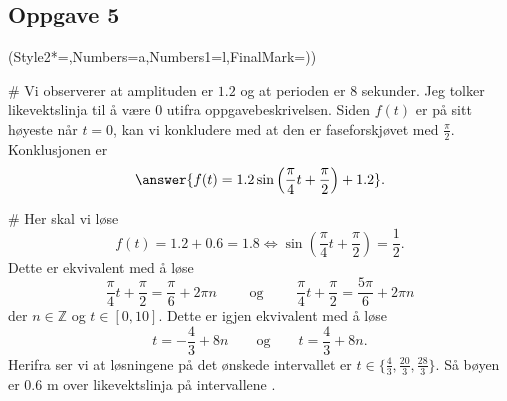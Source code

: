 \subsection*{Oppgave 5}
\begin{easylist}[enumerate]
	\ListProperties(Style2*=,Numbers=a,Numbers1=l,FinalMark={)})
	
	# Vi observerer at amplituden er $1.2$ og at perioden er $8$ sekunder. 
	Jeg tolker likevektslinja til å være $0$ utifra oppgavebeskrivelsen. 
	Siden $f(t)$ er på sitt høyeste når $t=0$, kan vi konkludere med at den er faseforskjøvet med $\frac{\pi}{2}$. 
	Konklusjonen er 
	\begin{equation*}
	\answer{f(t)=1.2\sin\left(\frac{\pi}{4}t + \frac{\pi}{2} \right) + 1.2}.
	\end{equation*}
	
	
	# Her skal vi løse 
	\begin{equation*}
	f(t)=1.2+0.6=1.8 \Longleftrightarrow \sin\left(\frac\pi4 t + \frac\pi2 \right)=\frac12 .
	\end{equation*}
	Dette er ekvivalent med å løse 
	\begin{equation*}
	\frac\pi4 t + \frac\pi2 = \frac\pi6 + 2\pi n \qquad \text{ og } \qquad \frac\pi4 t + \frac\pi2 = \frac{5\pi}{6} + 2\pi n
	\end{equation*}
	der $n \in \mathbb{Z}$ og $t \in [0,10]$. 
	Dette er igjen ekvivalent med å løse 
	\begin{equation*}
	t=-\frac{4}{3} + 8n \qquad \text{og} \qquad t=\frac43 + 8n.
	\end{equation*}
	Herifra ser vi at løsningene på det ønskede intervallet er $t\in\{\frac43, \frac{20}{3},\frac{28}{3}\}$.
	Så bøyen er 0.6 m over likevektslinja på intervallene .
\end{easylist}



